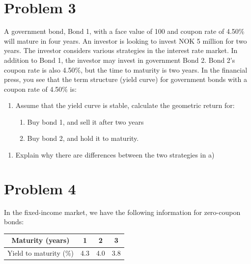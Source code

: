 \documentclass[12]{article}
\begin{document}
\section*{Problem 3}
A government bond, Bond 1, with a face value of 100 and coupon rate of 4.50\% will mature in four years. An investor is looking to invest NOK 5 million for two years. The investor considers various strategies in the interest rate market. In addition to Bond 1, the investor may invest in government Bond 2. Bond 2’s coupon rate is also 4.50\%, but the time to maturity is two years. In the financial press, you see that the term structure (yield curve) for government bonds with a coupon rate of 4.50\% is:
\begin{table}[H]
\centering
{}
\label{tab:my-table}
\end{table}
\begin{enumerate}
    \item[a)] Assume that the yield curve is stable, calculate the geometric return for:
    \begin{enumerate}
        \item[i)] Buy bond 1, and sell it after two years
        \item[ii)] Buy bond 2, and hold it to maturity.
    \end{enumerate}
    
\end{enumerate}




\color{black}
\begin{enumerate}
    \item[b)] Explain why there are differences between the two strategies in a)   
\end{enumerate}





\color{black}
\section*{Problem 4}
In the fixed-income market, we have the following information for zero-coupon bonds:

\begin{table}[H]
    \centering
    \begin{tabular}{cccc}
        Maturity (years) & 1 & 2 & 3\\\midrule
        Yield to maturity (\%) & 4.3 & 4.0 & 3.8\\
    \end{tabular}
    \label{tab:my_label}
\end{table}
\end{document}
